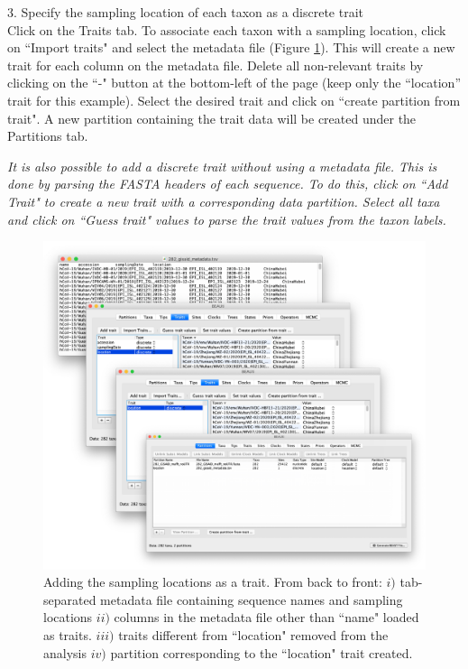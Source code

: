 \documentclass{article}
\newcommand{\ann}[1]{
\begin{adjustwidth}{0.5cm}{}
\it{#1}\\
\end{adjustwidth}}
\begin{document}
3. Specify the sampling location of each taxon as a discrete trait\\

Click on the Traits tab.
To associate each taxon with a sampling location, click on ``Import traits" and select the metadata file (Figure \ref{fig:location}).
This will create a new trait for each column on the metadata file. Delete all non-relevant traits by clicking on the ``-" button at the bottom-left of the page (keep only the ``location'' trait for this example). Select the desired trait and click on ``create partition from trait". A new partition containing the trait data will be created under the Partitions tab.\\

\ann{It is also possible to add a discrete trait without using a metadata file. This is done by parsing the FASTA headers of each sequence. To do this, click on ``Add Trait" to create a new trait with a corresponding data partition. Select all taxa and click on ``Guess trait" values to parse the trait values from the taxon labels.}

\begin{figure}[!ht]
    \centering
    \includegraphics[width=1\textwidth]{figs/location_trait.pdf}
    \caption{Adding the sampling locations as a trait. From back to front: $i)$ tab-separated metadata file containing sequence names and sampling locations $ii)$ columns in the metadata file other than ``name" loaded as traits. $iii)$ traits different from ``location" removed from the analysis $iv)$ partition corresponding to the ``location" trait created.}
    \label{fig:location}
\end{figure}
\end{document}
